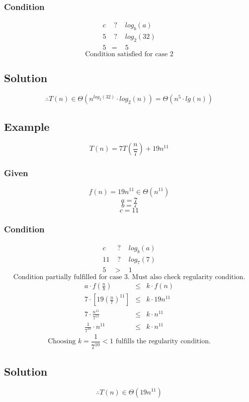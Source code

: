\subsubsection*{Condition}
\begin{eqnarray*}
	c &\text{ ? }& log_b(a)\\
	5 &\text{ ? }& log_2(32)\\
	5 &=& 5
\end{eqnarray*}
$$\text{Condition satisfied for case 2}$$

\subsection*{Solution}
$$
\therefore T(n) \in \Theta(n^{log_2(32)} \cdot log_2(n)) = \Theta(n^5 \cdot lg(n))
$$

\subsection{Example}
$$
T(n) = 7T(\frac{n}{7}) + 19n^{11}
$$

\subsubsection*{Given}
$$f(n) = 19n^{11} \in \Theta(n^{11})$$
$$a = 7$$
$$b = 7$$
$$c = 11$$

\subsubsection*{Condition}
\begin{eqnarray*}
	c &\text{ ? }& log_b(a)\\
	11 &\text{ ? }& log_7(7)\\
	5 &>& 1
\end{eqnarray*}
$$\text{Condition partially fulfilled for case 3. Must also check regularity condition.}$$
\begin{eqnarray*}
	a \cdot f(\frac{n}{b}) &\leq& k \cdot f(n)\\
	7 \cdot \left[ 19(\frac{n}{7})^{11} \right] &\leq& k \cdot 19n^{11}\\
	7 \cdot \frac{n^{11}}{7^{11}} &\leq& k \cdot n^{11}\\
	\frac{1}{7^{10}} \cdot n^{11} &\leq& k \cdot n^{11}
\end{eqnarray*}
$$\text{Choosing } k = \frac{1}{7^{10}} < 1 \text{ fulfills the regularity condition.}$$

\subsection*{Solution}
$$
\therefore T(n) \in \Theta(19n^{11})
$$
